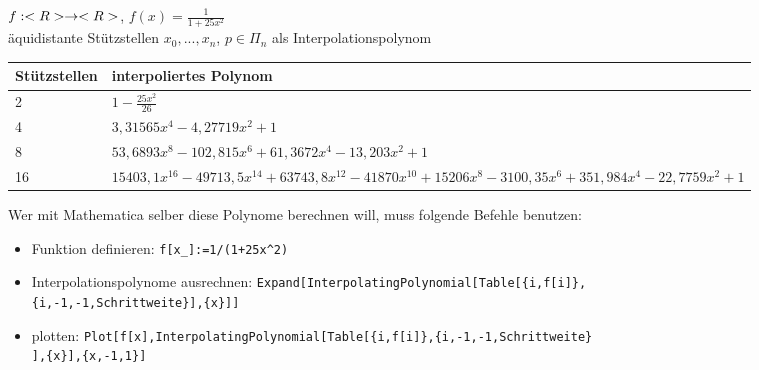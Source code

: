 \begin{example}
	$f:<R>\to<R>$, $f(x)=\frac{1}{1+25x^2}$ \\
	äquidistante Stützstellen $x_0,...,x_n$, $p\in\Pi_n$ als Interpolationspolynom
	\begin{center}
		\begin{tabular}{l|p{8cm}}
			\textbf{Stützstellen} & \textbf{interpoliertes Polynom} \\
			\hline
			2 & $1-\frac{25x^2}{26}$ \\
			\hline
			4 & $3,31565x^4 - 4,27719x^2 + 1$ \\
			\hline
			8 & $53,6893x^8 - 102,815x^6 + 61,3672x^4 - 13,203x^2 + 1$ \\
			\hline
			16 & $15403,1x^{16} - 49713,5x^{14} + 63743,8x^{12} - 41870x^{10} + 15206x^8 - 3100,35x^6 + 351,984x^4 - 22,7759x^2 + 1$
		\end{tabular}
	\end{center}
	\begin{center}\end{center}
\end{example}

\begin{*anmerkung}
	Wer mit Mathematica selber diese Polynome berechnen will, muss folgende Befehle benutzen:
	\begin{itemize}
	\item Funktion definieren: \verb|f[x_]:=1/(1+25x^2)|
	\item Interpolationspolynome ausrechnen: \texttt{Expand[InterpolatingPolynomial[Table[\{i,f[i]\},} \\
	\texttt{\{i,-1,-1,Schrittweite\}],\{x\}]]}
	\item plotten: \texttt{Plot[{f[x],InterpolatingPolynomial[Table[\{i,f[i]\},\{i,-1,-1,Schrittweite\}} \\
	\texttt{],\{x\}]},\{x,-1,1\}]}
	\end{itemize}
\end{*anmerkung}

